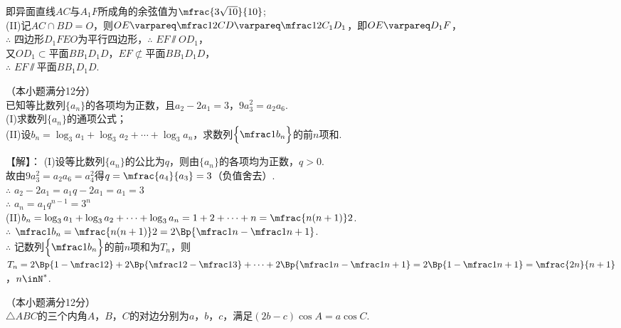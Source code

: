 \begin{exercise}
\begin{answer}
         即异面直线$AC$与$A_1F$所成角的余弦值为$\mfrac{3\sqrt{10}}{10}$;\\
      (II)记$AC\cap BD=O$，则$OE\varpareq\mfrac12CD\varpareq \mfrac12C_1D_1$，即$OE\varpareq D_1F$，\\
          $\therefore$ 四边形$D_1FEO$为平行四边形，$\therefore$ $EF\varparallel OD_1$，\\
          又$OD_1\subset \text{平面}BB_1D_1D$，$EF\nsubset \text{平面}BB_1D_1D$，\\
          $\therefore$ $EF\varparallel\text{平面}BB_1D_1D$.
    \end{answer}
  \vspace{2cm}
  \item%
    （本小题满分12分）\\
    已知等比数列$\{a_n\}$的各项均为正数，且$a_2-2a_1=3$，$9a_3^2=a_2a_6$.\\
    (I)求数列$\{a_n\}$的通项公式；\\
    (II)设$b_n=\log_3a_1+\log_3a_2+\cdots+\log_3a_n$，求数列$\Bigl\{\mfrac1{b_n}\Bigr\}$的前$n$项和.
    \begin{answer}
      【解】：
      (I)设等比数列$\{a_n\}$的公比为$q$，则由$\{a_n\}$的各项均为正数，$q>0$.\\
         故由$9a_3^2=a_2a_6=a_4^2$得$q=\mfrac{a_4}{a_3}=3$（负值舍去）.\\
         $\therefore$ $a_2-2a_1=a_1q-2a_1=a_1=3$\\
         $\therefore$ $a_n=a_1q^{n-1}=3^n$\\
      (II)$b_n=\log_3a_1+\log_3a_2+\cdots+\log_3a_n=1+2+\cdots+n=\mfrac{n(n+1)}2$.\\
          $\therefore$ $\mfrac1{b_n}=\mfrac{n(n+1)}2=2\Bp{\mfrac1n-\mfrac1{n+1}}$.\\
          $\therefore$ 记数列$\Bigl\{\mfrac1{b_n}\Bigr\}$的前$n$项和为$T_n$，则\\
          $T_n=2\Bp{1-\mfrac12}+2\Bp{\mfrac12-\mfrac13}+\cdots+2\Bp{\mfrac1n-\mfrac1{n+1}}
           =2\Bp{1-\mfrac1{n+1}}=\mfrac{2n}{n+1}$，$n\inN^*$.\\
    \end{answer}
  \clearpage
  \item%
    （本小题满分12分）\\
    $\triangle{ABC}$的三个内角$A$，$B$，$C$的对边分别为$a$，$b$，$c$，满足$(2b-c)\cos A=a\cos C$.\\

\end{exercise}
